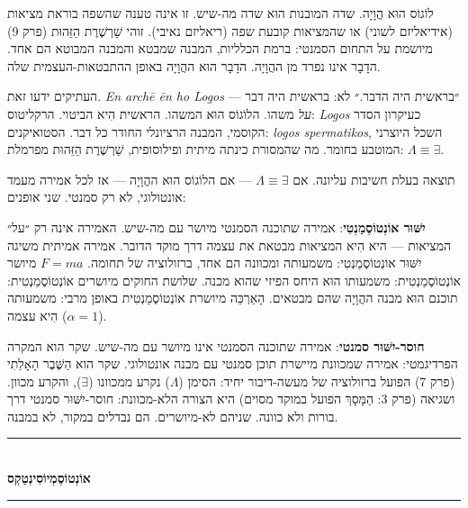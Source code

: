 \documentclass[10pt, openany, oneside]{book}
\renewcommand{\normalsize}{\fontsize{10}{13}\selectfont}
\begin{document}
\vspace{0.8em}

\noindent לוֹגוֹס הוּא הֲוָיָה. שדה המובנות הוּא שדה מה-שיש. זו אינה טענה שהשפה בוראת מציאות (אידיאליזם לשוני) או שהמציאות קובעת שפה (ריאליזם נאיבי). זוהי שַׁרְשֶׁרֶת הַזֵּהוּת (פרק 9) מיושמת על התחום הסמנטי: ברמת הכלליות, המבנה שמבטא והמבנה המבוטא הם אחד. הדָבָר אינו נפרד מן ההֲוָיָה. הדָבָר הוּא ההֲוָיָה באופן ההתבטאות-העצמית שלה.

העתיקים ידעו זאת. \textit{En archē ēn ho Logos} — ״בראשית היה הדבר.״ לא: בראשית היה דבר \textit{על} משהו. הלוֹגוֹס הוּא המשהו. הראשית הִיא הביטוי. הרקליטוס: \textit{Logos} כעיקרון הסדר הקוסמי, המבנה הרציונלי החודר כל דבר. הסטואיקנים: \textit{logos spermatikos}, השכל היוצרני המוטבע בחומר. מה שהמסורת כינתה מיתית ופילוסופית, שַׁרְשֶׁרֶת הַזֵּהוּת מפרמלת: $\Lambda \equiv \exists$.

תוצאה בעלת חשיבות עליונה. אם $\Lambda \equiv \exists$ — אם הלוֹגוֹס הוּא ההֲוָיָה — אז לכל אמירה מעמד אונטולוגי, לא רק סמנטי. שני אופנים:

\textbf{יִשּׁוּר אוֹנְטוֹסֶמַנְטִי}: אמירה שתוכנה הסמנטי מיושר עם מה-שיש. האמירה אינה רק ״על״ המציאות — היא הִיא המציאות מבטאת את עצמה דרך מוקד הדובר. אמירה אמיתית משיגה יִשּׁוּר אוֹנְטוֹסֶמַנְטִי: משמעותה ומכוונה הם אחד, ברזולוציה של תחומה. $F = ma$ מיושר אוֹנְטוֹסֶמַנְטִית: משמעותו הוּא היחס הפיזי שהוא מכנה. שלושת החוקים מיושרים אוֹנְטוֹסֶמַנְטִית: תוכנם הוּא מבנה ההֲוָיָה שהם מבטאים. הָאַרְכֵּה מיושרת אוֹנְטוֹסֶמַנְטִית באופן מרבי: משמעותה הִיא עצמה ($\alpha = 1$).

\textbf{חוסר-יִשּׁוּר סמנטי}: אמירה שתוכנה הסמנטי אינו מיושר עם מה-שיש. שקר הוא המקרה הפרדיגמטי: אמירה שמכוונת מיישרת תוכן סמנטי עם מבנה אונטולוגי. שקר הוא הַשֶּׁבֶר הָאָלֵתִי (פרק 7) הפועל ברזולוציה של מעשה-דיבור יחיד: הסימן ($\Lambda$) נקרע ממכוונו ($\exists$), והקרע מכוון. ושגיאה (פרק 3: הַמָּסָךְ הפועל במוקד מסוים) היא הצורה הלא-מכוונת: חוסר-יִשּׁוּר סמנטי דרך בורות ולא כוונה. שניהם לא-מיושרים. הם נבדלים במקור, לא במבנה.

\vspace{1.5em}


\begin{center}
    \rule{0.3\textwidth}{0.4pt}\\[0.5em]
    {\normalsize\bfseries\textsc{אוֹנְטוֹסֶמְיוֹסִינְטַקְס}}\\[0.3em]
    \rule{0.3\textwidth}{0.4pt}
\end{center}
\end{document}
